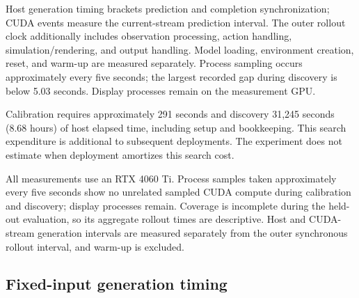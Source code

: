 \documentclass{article}
\begin{document}
Host generation timing brackets prediction and completion synchronization;
CUDA events measure the current-stream prediction interval. The outer rollout
clock additionally includes observation processing, action handling,
simulation/rendering, and output handling. Model loading, environment creation,
reset, and warm-up are measured separately. Process sampling occurs approximately
every five seconds; the largest recorded gap during discovery is below
5.03 seconds. Display processes remain on the measurement GPU.

\begin{table}[htbp]
\centering\small
\caption{Discovery resource measurements. Generated-chunk totals use the declared
dense-arithmetic boundary and charge partially executed final prefixes.
Episode means include unsuccessful attempts. $(2,2)$ has 26/40 observed
successes at 42.9\% of the native nominal arithmetic rate.}
\label{tab:resources}

\end{table}

Calibration requires approximately 291 seconds and discovery 31,245 seconds
(8.68 hours) of host elapsed time, including setup and bookkeeping. This search
expenditure is additional to subsequent deployments. The experiment does not
estimate when deployment amortizes this search cost.

All measurements use an RTX 4060 Ti. Process samples taken approximately every
five seconds show no unrelated sampled CUDA compute during calibration and
discovery; display processes remain. Coverage is incomplete during the held-out
evaluation, so its aggregate rollout times are descriptive. Host and CUDA-stream
generation intervals are measured separately from the outer synchronous rollout
interval, and warm-up is excluded.

\subsection{Fixed-input generation timing}
\label{app:fixed-timing}
\end{document}
